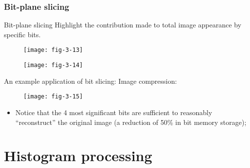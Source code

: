 \subsubsection{Bit-plane slicing}




\begin{frame}{Bit-plane slicing}
Highlight the contribution made to total image appearance by specific bits.
\begin{figure}
\centering
\texttt{[image: fig-3-13]}
\end{figure}
\end{frame}


\begin{frame}
\begin{figure}
\centering
\texttt{[image: fig-3-14]}
\end{figure}
\end{frame}


\begin{frame}
An example application of bit slicing: Image compression:
\begin{figure}
\centering
\texttt{[image: fig-3-15]}
\end{figure}
\begin{itemize}
\item Notice that the 4 most significant bits are sufficient to reasonably ``reconstruct'' the original image (a reduction of 50\% in bit memory storage);
\end{itemize}
\end{frame}


\section{Histogram processing}

